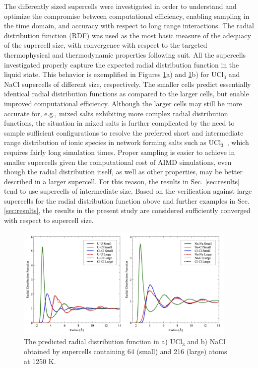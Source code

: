 \documentclass[preprint,3p,10pt,onecolumn,number,sort&compress]{elsarticle}
\begin{document}
The differently sized supercells were investigated in order to understand and optimize the compromise between computational efficiency, enabling sampling in the time domain, and accuracy with respect to long range interactions. The radial distribution function (RDF) was used as the most basic measure of the adequacy of the supercell size, with convergence with respect to the targeted thermophysical and thermodynamic properties following suit. All the supercells investigated properly capture the expected radial distribution function in the liquid state. This behavior is exemplified in Figures \ref{fig:radial}a) and \ref{fig:radial}b) for UCl$_3$ and NaCl supercells of different size, respectively. The smaller cells predict essentially identical radial distribution functions as compared to the larger cells, but enable improved computational efficiency. Although the larger cells may still be more accurate for, e.g., mixed salts exhibiting more complex radial distribution functions, the situation in mixed salts is further complicated by the need to sample sufficient configurations to resolve the preferred short and intermediate range distribution of ionic species in network forming salts such as UCl$_3$~\cite{Li}, which requires fairly long simulation times. Proper sampling is easier to achieve in smaller supercells given the computational cost of AIMD simulations, even though the radial distribution itself, as well as other properties, may be better described in a larger supercell. For this reason, the results in Sec. \ref{sec:results} tend to use supercells of intermediate size.  Based on the verification against large supercells for the radial distribution function above and further examples in Sec. \ref{sec:results}, the results in the present study are considered sufficiently converged with respect to supercell size.

\begin{figure}[htb]
\centering
\includegraphics[width=0.95\textwidth]{fig1.jpg}
\caption{The predicted radial distribution function in a) UCl$_3$ and b) NaCl obtained by supercells containing 64 (small) and 216 (large) atoms at 1250 K.} 
\label{fig:radial}
\end{figure}
\end{document}
